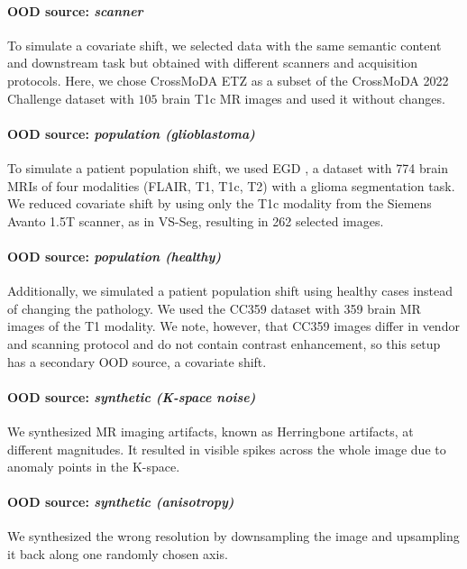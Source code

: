 \paragraph{OOD source: \textit{scanner}}
To simulate a covariate shift, we selected data with the same semantic content and downstream task but obtained with different scanners and acquisition protocols. Here, we chose CrossMoDA ETZ as a subset of the CrossMoDA 2022 Challenge dataset \cite{reuben_dorent_2022_6504722} with $105$ brain T1c MR images and used it without changes.


\paragraph{OOD source: \textit{population (glioblastoma)}}
To simulate a patient population shift, we used EGD \cite{van2021erasmus}, a dataset with 774 brain MRIs of four modalities (FLAIR, T1, T1c, T2) with a glioma segmentation task. We reduced covariate shift by using only the T1c modality from the Siemens Avanto 1.5T scanner, as in VS-Seg, resulting in 262 selected images.


\paragraph{OOD source: \textit{population (healthy)}}
Additionally, we simulated a patient population shift using healthy cases instead of changing the pathology. We used the CC359 \cite{souza2018open} dataset with 359 brain MR images of the T1 modality. We note, however, that CC359 images differ in vendor and scanning protocol and do not contain contrast enhancement, so this setup has a secondary OOD source, a covariate shift.


\paragraph{OOD source: \textit{synthetic (K-space noise)}}
We synthesized MR imaging artifacts, known as Herringbone artifacts, at different magnitudes. It resulted in visible spikes across the whole image due to anomaly points in the K-space. 


\paragraph{OOD source: \textit{synthetic (anisotropy)}}
We synthesized the wrong resolution by downsampling the image and upsampling it back along one randomly chosen axis.


